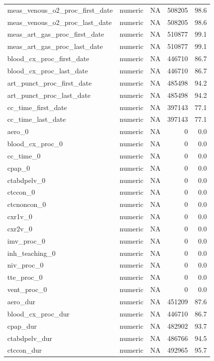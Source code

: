 \documentclass[
  11pt,
  letterpaper,
  DIV=11,
  numbers=noendperiod]{scrartcl}
\begin{document}
\begin{longtable*}{llrrr}
meas\_venous\_o2\_proc\_first\_date & numeric & NA & 508205 & 98.6\\
meas\_venous\_o2\_proc\_last\_date & numeric & NA & 508205 & 98.6\\
meas\_art\_gas\_proc\_first\_date & numeric & NA & 510877 & 99.1\\
meas\_art\_gas\_proc\_last\_date & numeric & NA & 510877 & 99.1\\
\addlinespace
blood\_cx\_proc\_first\_date & numeric & NA & 446710 & 86.7\\
blood\_cx\_proc\_last\_date & numeric & NA & 446710 & 86.7\\
art\_punct\_proc\_first\_date & numeric & NA & 485498 & 94.2\\
art\_punct\_proc\_last\_date & numeric & NA & 485498 & 94.2\\
cc\_time\_first\_date & numeric & NA & 397143 & 77.1\\
\addlinespace
cc\_time\_last\_date & numeric & NA & 397143 & 77.1\\
aero\_0 & numeric & NA & 0 & 0.0\\
blood\_cx\_proc\_0 & numeric & NA & 0 & 0.0\\
cc\_time\_0 & numeric & NA & 0 & 0.0\\
cpap\_0 & numeric & NA & 0 & 0.0\\
\addlinespace
ctabdpelv\_0 & numeric & NA & 0 & 0.0\\
ctccon\_0 & numeric & NA & 0 & 0.0\\
ctcnoncon\_0 & numeric & NA & 0 & 0.0\\
cxr1v\_0 & numeric & NA & 0 & 0.0\\
cxr2v\_0 & numeric & NA & 0 & 0.0\\
\addlinespace
imv\_proc\_0 & numeric & NA & 0 & 0.0\\
inh\_teaching\_0 & numeric & NA & 0 & 0.0\\
niv\_proc\_0 & numeric & NA & 0 & 0.0\\
tte\_proc\_0 & numeric & NA & 0 & 0.0\\
vent\_proc\_0 & numeric & NA & 0 & 0.0\\
\addlinespace
aero\_dur & numeric & NA & 451209 & 87.6\\
blood\_cx\_proc\_dur & numeric & NA & 446710 & 86.7\\
cpap\_dur & numeric & NA & 482902 & 93.7\\
ctabdpelv\_dur & numeric & NA & 486766 & 94.5\\
ctccon\_dur & numeric & NA & 492965 & 95.7\\

\end{longtable*}
\end{document}
